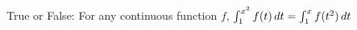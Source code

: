 \documentclass{ximera}
\author{Steven Gubkin}
\begin{document}
\begin{exercise}

True or False:  For any continuous function $f$, $\int_1^{x^2} f(t) \mathop{}\!d t = \int_1^x f(t^2) \mathop{}\!d t$


\begin{prompt}
	\begin{multipleChoice}
	\end{multipleChoice}
\end{prompt}

\end{exercise}
\end{document}
